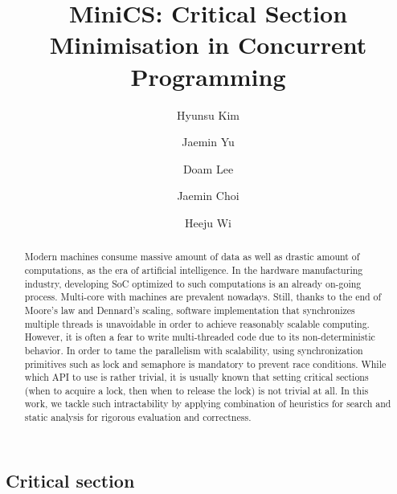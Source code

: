 \documentclass[sigconf]{acmart}
\begin{document}
\title{MiniCS: Critical Section Minimisation in Concurrent Programming}
\author{Hyunsu Kim}

\author{Jaemin Yu}

\author{Doam Lee}

\author{Jaemin Choi}

\author{Heeju Wi}

\begin{abstract}
Modern machines consume massive amount of data as well as drastic amount of computations, as the era of artificial intelligence. In the hardware manufacturing industry, developing SoC optimized to such computations is an already on-going process. Multi-core with machines are prevalent nowadays. Still, thanks to the end of Moore's law and Dennard's scaling, software implementation that synchronizes multiple threads is unavoidable in order to achieve reasonably scalable computing. However, it is often a fear to write multi-threaded code due to its non-deterministic behavior. In order to tame the parallelism with scalability, using synchronization primitives such as lock and semaphore is mandatory to prevent race conditions. While which API to use is rather trivial, it is usually known that setting critical sections (when to acquire a lock, then when to release the lock) is not trivial at all. In this work, we tackle such intractability by applying combination of heuristics for search and static analysis for rigorous evaluation and correctness.
\end{abstract}

\maketitle





\subsection{Critical section}
\end{document}
